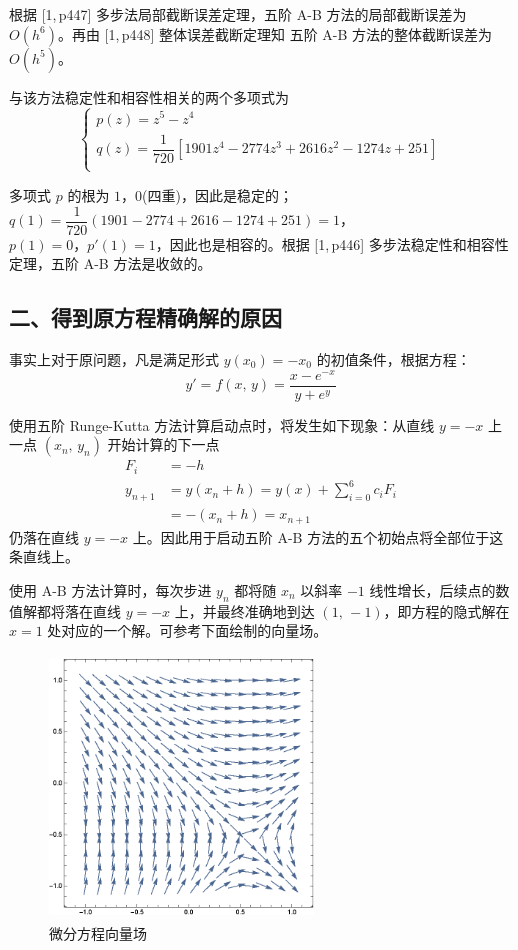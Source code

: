 \documentclass{ctexart}
\begin{document}
		根据 [1,\,p447] 多步法局部截断误差定理，五阶 A-B 方法的局部截断误差为 $O(h^6)$。再由 [1,\,p448] 整体误差截断定理知 五阶 A-B 方法的整体截断误差为 $O(h^5)$。
		
		与该方法稳定性和相容性相关的两个多项式为
		\begin{equation}
		\begin{cases}
			p(z) = z^5 - z^4 \\
			q(z) = \dfrac{1}{720}\left[ 1901 z^4 - 2774 z^3 + 2616 z^2 - 1274 z + 251 \right] \\
		\end{cases}
		\end{equation}
		
		多项式 $p$ 的根为 $1$，$0$(四重)，因此是稳定的；$q(1) = \dfrac{1}{720}(1901 - 2774 + 2616 - 1274 + 251) = 1$，\\[0.8mm]
		$p(1) = 0$，$p'(1) = 1$，因此也是相容的。根据 [1,\,p446] 多步法稳定性和相容性定理，五阶 A-B 方法是收敛的。
		
		
	\subsection*{二、得到原方程精确解的原因}
		事实上对于原问题，凡是满足形式 $y(x_0) = - x_0$ 的初值条件，根据方程：
		\begin{equation}
			y' = f(x,\,y) = \dfrac{x − e^{−x}}{y + e^y}
		\end{equation}
		
		\noindent 使用五阶 Runge-Kutta 方法计算启动点时，将发生如下现象：从直线 $y = -x$ 上一点 $(x_n,\,y_n)$ 开始计算的下一点
		\begin{align*}
			F_i & = -h\\
			y_{n+1} & = y(x_n + h) = y(x) + \sum_{i = 0}^{6} c_i F_i \\
				& = - (x_n + h) = x_{n+1}
		\end{align*}
		仍落在直线 $y = -x$ 上。因此用于启动五阶 A-B 方法的五个初始点将全部位于这条直线上。
		
		使用 A-B 方法计算时，每次步进 $y_n$ 都将随 $x_n$ 以斜率 $-1$ 线性增长，后续点的数值解都将落在直线 $y = -x$ 上，并最终准确地到达 $(1,\,-1)$，即方程的隐式解在 $x = 1$ 处对应的一个解。可参考下面绘制的向量场。
		
		\begin{figure}[H]
			\centering
			\includegraphics[width = 7cm, height = 7cm]{contour.eps}
			\caption{微分方程向量场} \label{figure.label}
		\end{figure}
		
\end{document}
